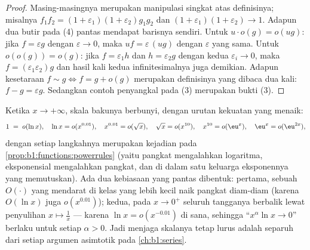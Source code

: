 \begin{proof}
Masing-masingnya merupakan manipulasi singkat atas definisinya; misalnya
$f_1 f_2 = (1+\varepsilon_1)(1+\varepsilon_2) g_1 g_2$ dan $(1 +
\varepsilon_1)(1+\varepsilon_2) \to 1$. Adapun dua butir pada (4) pantas
mendapat barisnya sendiri. Untuk $u\cdot o(g) = o(ug)$: jika $f = \varepsilon g$ dengan
$\varepsilon \to 0$, maka $uf = \varepsilon\,(ug)$ dengan $\varepsilon$ yang
sama. Untuk $o(o(g)) = o(g)$: jika $f = \varepsilon_1 h$ dan
$h = \varepsilon_2 g$ dengan kedua $\varepsilon_i \to 0$, maka $f =
(\varepsilon_1\varepsilon_2) g$ dan hasil kali kedua
infinitesimalnya juga demikian. Adapun kesetaraan $f \sim g \iff f = g +
o(g)$ merupakan definisinya yang dibaca dua kali: $f - g = \varepsilon g$.
Sedangkan contoh penyangkal pada (3) merupakan bukti (3).
\end{proof}

\begin{example}\label{ex:b1:taylor:scale}
Ketika $x \to +\infty$, skala bakunya berbunyi, dengan urutan
kekuatan yang menaik:
\[
1 \;=\; o(\ln x), \quad
\ln x = o(x^{0.01}), \quad
x^{0.01} = o(\sqrt x), \quad
\sqrt x = o(x^{10}), \quad
x^{10} = o(\eu^{x}), \quad
\eu^x = o(\eu^{2x}) ,
\]
dengan setiap langkahnya merupakan kejadian  pada
\cref{prop:b1:functions:powerrules} (yaitu pangkat mengalahkan logaritma,
eksponensial mengalahkan pangkat, dan di dalam satu keluarga eksponennya
yang memutuskan). Ada dua kebiasaan yang pantas dibentuk: pertama, sebuah $O(\cdot)$ yang mendarat
di kelas yang lebih kecil naik pangkat diam-diam (karena $O(\ln x)$ juga
$o(x^{0.01})$); kedua, pada $x \to 0^+$ seluruh tangganya
berbalik lewat penyulihan $x \mapsto \frac1x$ ---
karena $\ln x = o(x^{-0.01})$ di sana, sehingga ``$x^\alpha \ln x \to 0$''
berlaku untuk setiap $\alpha > 0$. Jadi menjaga skalanya tetap lurus adalah
separuh dari setiap argumen asimtotik pada
\cref{ch:b1:series}.
\end{example}

